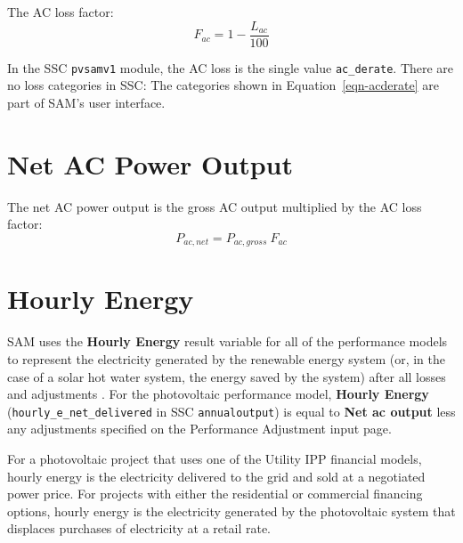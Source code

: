 \documentclass[12pt,letterpaper]{article}
\begin{document}
The AC loss factor:
\begin{equation}
F_{ac}=1-\frac{L_{ac}}{100}
\end{equation}

In the SSC \texttt{pvsamv1} module, the AC loss is the single value \texttt{ac\_derate}. There are no loss categories in SSC: The categories shown in Equation~\ref{eqn-acderate} are part of SAM's user interface.

\section{Net AC Power Output}\label{sec-netacoutput}

The net AC power output is the gross AC output multiplied by the AC loss factor:
\begin{equation}
P_{ac,net}= P_{ac,gross}~F_{ac}
\end{equation}

\section{Hourly Energy} \label{sec-hourlyenergy}

SAM uses the \textbf{Hourly Energy} result variable for all of the performance models to represent the electricity generated by the renewable energy system (or, in the case of a solar hot water system, the energy saved by the system) after all losses and adjustments \citep{help-hourlyenergy}. For the photovoltaic performance model, \textbf{Hourly Energy} (\texttt{hourly\_e\_net\_delivered} in SSC \texttt{annualoutput}) is equal to \textbf{Net ac output} less any adjustments specified on the Performance Adjustment input page. 

For a photovoltaic project that uses one of the Utility IPP financial models, hourly energy is the electricity delivered to the grid and sold at a negotiated power price. For projects with either the residential or commercial financing options, hourly energy is the electricity generated by the photovoltaic system that displaces purchases of electricity at a retail rate.



\cleardoublepage

\label{sec:Bib}
%
\end{document}
